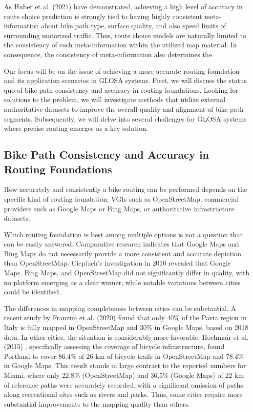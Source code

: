 As Huber et al. (2021) \cite{huber_modelling_2021} have demonstrated, achieving a high level of accuracy in route choice prediction is strongly tied to having highly consistent meta-information about bike path type, surface quality, and also speed limits of surrounding motorized traffic. Thus, route choice models are naturally limited to the consistency of such meta-information within the utilized map material. In consequence, the consistency of meta-information also determines the

Our focus will be on the issue of achieving a more accurate routing foundation and its application scenarios in GLOSA systems. First, we will discuss the status quo of bike path consistency and accuracy in routing foundations. Looking for solutions to the problem, we will investigate methods that utilize external authoritative datasets to improve the overall quality and alignment of bike path segments. Subsequently, we will delve into several challenges for GLOSA systems where precise routing emerges as a key solution.

\subsection{Bike Path Consistency and Accuracy in Routing Foundations}

How accurately and consistently a bike routing can be performed depends on the specific kind of routing foundation: VGIs such as OpenStreetMap, commercial providers such as Google Maps or Bing Maps, or authoritative infrastructure datasets.

Which routing foundation is best among multiple options is not a question that can be easily answered. Comparative research indicates that Google Maps and Bing Maps do not necessarily provide a more consistent and accurate depiction than OpenStreetMap. Ciepluch's investigation in 2010 \cite{ciepluch_comparison_2010} revealed that Google Maps, Bing Maps, and OpenStreetMap did not significantly differ in quality, with no platform emerging as a clear winner, while notable variations between cities could be identified.

The differences in mapping completeness between cities can be substantial. A recent study by Franzini et al. (2020) \cite{franzini_assessment_2020} found that only 40\% of the Pavia region in Italy is fully mapped in OpenStreetMap and 30\% in Google Maps, based on 2018 data. In other cities, the situation is considerably more favorable. Hochmair et al. (2015) \cite{hochmair_assessing_2015}, specifically assessing the coverage of bicycle infrastructure, found Portland to cover 86.4\% of 26 km of bicycle trails in OpenStreetMap and 78.4\% in Google Maps. This result stands in large contrast to the reported numbers for Miami, where only 22.8\% (OpenStreetMap) and 36.5\% (Google Maps) of 22 km of reference paths were accurately recorded, with a significant omission of paths along recreational sites such as rivers and parks. Thus, some cities require more substantial improvements to the mapping quality than others.

